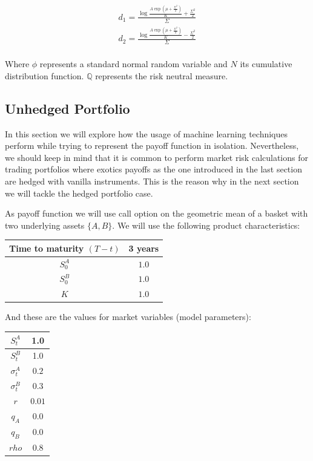 $$
\begin{aligned}
d_1 = \frac{\log\frac{A\exp\left(\mu+\frac{\Sigma^2}{2}\right)}{K}+\frac{\Sigma^2}{2}}{\Sigma} \\
d_2 = \frac{\log\frac{A\exp\left(\mu+\frac{\Sigma^2}{2}\right)}{K}-\frac{\Sigma^2}{2}}{\Sigma} \\
\end{aligned}
$$



Where $\phi$ represents a standard normal random variable and $N$ its cumulative distribution function. $\mathbb{Q}$ represents the risk neutral measure.


\subsection{Unhedged Portfolio}
 In this section we will explore how the usage of machine learning techniques perform while trying to represent the payoff function in isolation. Nevertheless, we should keep in mind that it is common to perform market risk calculations for trading portfolios where exotics payoffs as the one introduced in the last section are hedged with vanilla instruments. This is the reason why in the next section we will tackle the hedged portfolio case. 
 
 As payoff function we will use call option on the geometric mean of a basket with two underlying assets $\{A,B\}$. We will use the following product characteristics:
 
\begin{center}
\begin{tabular}{||c | c||} 
 \hline
 Time to maturity $(T-t)$ & 3 years \\
 \hline
 $S_0^A$ & $1.0$ \\
 \hline
 $S_0^B$ & $1.0$ \\
 \hline
 $K$ & $1.0$ \\
 \hline
 \end{tabular}
\end{center}

And these are the values for market variables (model parameters):

\begin{center}
\begin{tabular}{||c | c||} 
 \hline
 $S_t^A$ & 1.0 \\
 \hline
 $S_t^B$ & 1.0 \\
 \hline
 $\sigma_t^A$ & $0.2$ \\
 \hline
 $\sigma_t^B$ & $0.3$ \\
 \hline
 $r$ & $0.01$ \\
 \hline
 $q_A$ & $0.0$ \\
 \hline
 $q_B$ & $0.0$ \\
 \hline
 $rho$ & $0.8$ \\
 \hline
\end{tabular}
\end{center}

